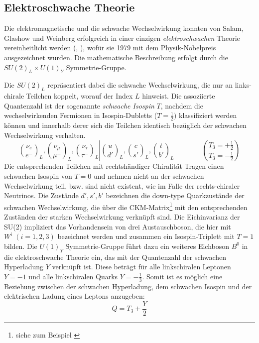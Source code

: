 \subsection{Elektroschwache Theorie}
\label{theory:electroweak}
Die elektromagnetische und die schwache Wechselwirkung konnten von Salam,
Glashow und Weinberg erfolgreich in einer einzigen \textit{elektroschwachen}
Theorie vereinheitlicht werden (\cite{Glashow:1961tr}, \cite{Weinberg:1967tq}),
wofür sie 1979 mit dem Physik-Nobelpreis ausgezeichnet wurden. Die
mathematische Beschreibung erfolgt durch die $SU(2)_L \times U(1)_Y$
Symmetrie-Gruppe.

Die $SU(2)_L$ repräsentiert dabei die schwache Wechselwirkung, die nur an
links-chirale Teilchen koppelt, worauf der Index $L$ hinweist. Die assoziierte
Quantenzahl ist der sogenannte \textit{schwache Isospin} $T$, nachdem die
wechselwirkenden Fermionen in Isospin-Dubletts ($T=\frac{1}{2})$ klassifiziert
werden können und innerhalb derer sich die Teilchen identisch bezüglich der
schwachen Wechselwirkung verhalten.
\begin{equation*}
    \left.
    \binom{\nu_e}{e^-}_L , \binom{\nu_\mu}{\mu^-}_L ,
    \binom{\nu_\tau}{\tau^-}_L
    \right|
    \binom{u}{d'}_L , \binom{c}{s'}_L , \binom{t}{b'}_L 
    \qquad\qquad
    \binom{T_3 = +\frac{1}{2}}{T_3 = -\frac{1}{2}}
\end{equation*}
Die entsprechenden Teilchen mit rechtshändiger Chiralität Tragen einen
schwachen Isospin von $T=0$ und nehmen nicht an der schwachen Wechselwirkung
teil, bzw. sind nicht existent, wie im Falle der rechts-chiraler Neutrinos. Die
Zustände $d',s',b'$ bezeichnen die down-type Quarkzustände der schwachen
Wechselwirkung, die über die CKM-Matrix\footnote{siehe zum Beispiel 
\cite{PhysRevD.86.010001}} mit den entsprechenden Zuständen der starken
Wechselwirkung verknüpft sind. Die Eichinvarianz der SU(2) impliziert das
Vorhandensein von drei Austauschboson, die hier mit $W^i\; (i=1,2,3)$
bezeichnet werden und zusammen ein Isospin-Triplett mit $T=1$ bilden. Die
$U(1)_Y$ Symmetrie-Gruppe führt dazu ein weiteres Eichboson $B^0$ in die
elektroschwache Theorie ein, das mit der Quantenzahl der schwachen Hyperladung
$Y$ verknüpft ist. Diese beträgt für alle linkschiralen Leptonen $Y=-1$ und
alle linkschiralen Quarks $Y=-\frac{1}{3}$. Somit ist es möglich eine Beziehung
zwischen der schwachen Hyperladung, dem schwachen Isospin und der elektrischen
Ladung eines Leptons anzugeben:
\begin{equation}
    Q = T_3 + \frac{Y}{2}
    \label{eq:charge_relation}
\end{equation}

